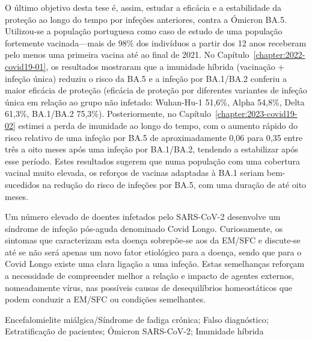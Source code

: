 O último objetivo desta tese é, assim, estudar a eficácia e a estabilidade da proteção ao longo do tempo por infeções anteriores, contra a Ómicron BA.5. Utilizou-se a população portuguesa como caso de estudo de uma população fortemente vacinada---mais de 98\% dos indivíduos a partir dos 12 anos receberam  pelo menos uma primeira vacina até ao final de 2021. No Capítulo~\ref{chapter:2022-covid19-01}, os resultados mostraram que a imunidade híbrida (vacinação + infeção única) reduziu o risco da BA.5 e a infeção por BA.1/BA.2 conferiu a maior eficácia de proteção (eficácia de proteção por diferentes variantes de infeção única em relação ao grupo não infetado: Wuhan-Hu-1 51,6\%, Alpha 54,8\%, Delta 61,3\%, BA.1/BA.2 75,3\%). Posteriormente, no Capítulo~\ref{chapter:2023-covid19-02} estimei a perda de imunidade ao longo do tempo, com o aumento rápido do risco relativo de uma infeção por BA.5 de aproximadamente 0,06 para 0,35 entre três a oito meses após uma infeção por BA.1/BA.2, tendendo a estabilizar após esse período. Estes resultados sugerem que numa população com uma cobertura vacinal muito elevada, os reforços de vacinas adaptadas à BA.1 seriam bem-sucedidos na redução do risco de infeções por BA.5, com uma duração de até oito meses.


Um número elevado de doentes infetados pelo SARS-CoV-2 desenvolve um síndrome de infeção pós-aguda denominado Covid Longo. Curiosamente, os sintomas que caracterizam esta doença sobrepõe-se aos da EM/SFC e discute-se até se não será apenas um novo fator etiológico para a doença, sendo que para o Covid Longo existe uma clara ligação a uma infeção. Estas semelhanças reforçam a necessidade de compreender melhor a relação e impacto de agentes externos, nomeadamente vírus, nas possíveis causas de desequilíbrios homeostáticos que podem conduzir a EM/SFC ou condições semelhantes.
\vfill

Encefalomielite miálgica/Síndrome de fadiga crónica; Falso diagnóstico; Estratificação de pacientes; Ómicron SARS-CoV-2; Imunidade híbrida
